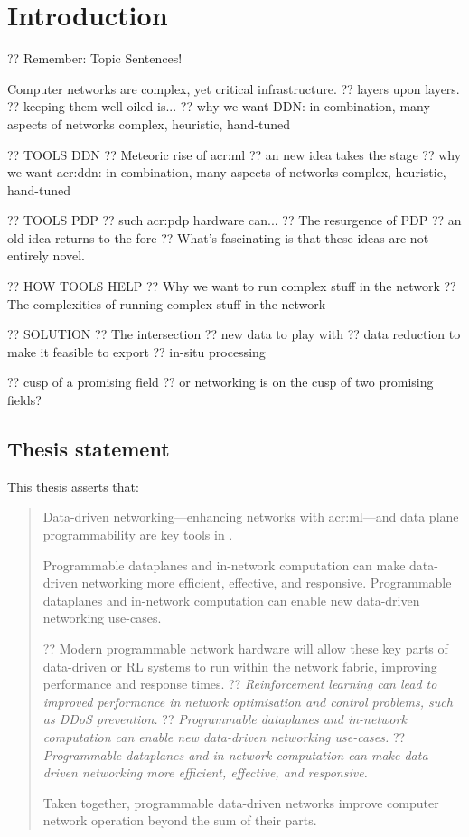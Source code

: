 \chapter{Introduction}\label{chap:intro}


?? Remember: Topic Sentences!

Computer networks are complex, yet critical infrastructure.
?? layers upon layers.
?? keeping them well-oiled is...
?? why we want DDN: in combination, many aspects of networks complex, heuristic, hand-tuned

?? TOOLS DDN
?? Meteoric rise of \gls{acr:ml}
?? an new idea takes the stage
?? why we want \gls{acr:ddn}: in combination, many aspects of networks complex, heuristic, hand-tuned

?? TOOLS PDP
?? such \gls{acr:pdp} hardware can...
?? The resurgence of PDP
?? an old idea returns to the fore
?? What's fascinating is that these ideas are not entirely novel.

?? HOW TOOLS HELP
?? Why we want to run complex stuff in the network
?? The complexities of running complex stuff in the network

?? SOLUTION
?? The intersection
?? new data to play with
?? data reduction to make it feasible to export
?? in-situ processing

?? cusp of a promising field
?? or networking is on the cusp of two promising fields?

\section{Thesis statement}
This thesis asserts that:
\begin{quotation}
	\noindent
	Data-driven networking---enhancing networks with \gls{acr:ml}---and data plane programmability are key tools in .
	
	Programmable dataplanes and in-network computation can make data-driven networking more efficient, effective, and responsive.
	Programmable dataplanes and in-network computation can enable new data-driven networking use-cases.
	
	
	?? Modern programmable network hardware will allow these key parts of data-driven or RL systems to run within the network fabric, improving performance and response times.
	?? \emph{Reinforcement learning can lead to improved performance in network optimisation and control problems, such as DDoS prevention.}
	?? \emph{Programmable dataplanes and in-network computation can enable new data-driven networking use-cases.}
	?? \emph{Programmable dataplanes and in-network computation can make data-driven networking more efficient, effective, and responsive.}
	
	Taken together, programmable data-driven networks improve computer network operation beyond the sum of their parts.
\end{quotation}

